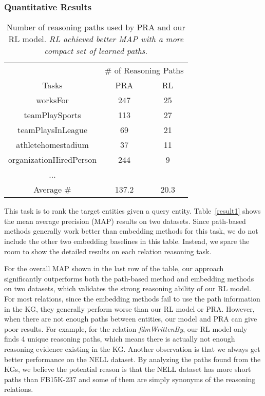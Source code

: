 \documentclass[11pt,letterpaper]{article}
\begin{document}
\subsubsection{Quantitative Results}
\begin{table}[t]
\centering
\begin{tabular}{ccc}
\toprule
& \multicolumn{2}{c}{\# of Reasoning Paths}\\
\cmidrule{2-3}
Tasks & PRA & RL \\ \midrule
worksFor & 247 & 25\\
teamPlaySports & 113 & 27\\
teamPlaysInLeague & 69 & 21\\
athletehomestadium & 37 & 11\\
organizationHiredPerson & 244 & 9\\
... & &\\
Average \# &137.2 & 20.3\\
\bottomrule
\end{tabular}
\caption{Number of reasoning paths used by PRA and our RL model. \emph{RL achieved better MAP with a more compact set of learned paths.}}
\label{result3}
\end{table}
 This task is to rank the target entities given a query entity. Table~\ref{result1} shows the mean average precision (MAP) results on two datasets. Since path-based methods generally work better than embedding methods for this task, we do not include the other two embedding baselines in this table. Instead, we spare the room to show the detailed results on each relation reasoning task.

For the overall MAP shown in the last row of the table, our approach significantly outperforms both the path-based method and embedding methods on two datasets, which validates the strong reasoning ability of our RL model. For most relations, since the embedding methods fail to use the path information in the KG, they generally perform worse than our RL model or PRA. However, when there are not enough paths between entities, our model and PRA can give poor results. For example, for the relation \textit{filmWrittenBy}, our RL model only finds 4 unique reasoning paths, which means there is actually not enough reasoning evidence existing in the KG. Another observation is that we always get better performance on the NELL dataset. By analyzing the paths found from the KGs, we believe the potential reason is that the NELL dataset has more short paths than FB15K-237 and some of them are simply synonyms of the reasoning relations. 
\end{document}
